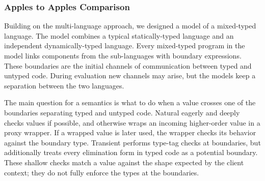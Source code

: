 

\subsubsection{Apples to Apples Comparison}


Building on the  multi-language approach, we designed
 a model of a mixed-typed language.
The model combines a typical statically-typed language and an independent
 dynamically-typed language.
Every mixed-typed program in the model links components from the sub-languages
 with boundary expressions.
These boundaries are the initial channels of communication between typed and
 untyped code.
During evaluation new channels may arise, but the models keep a separation
 between the two languages.

The main question for a semantics is what to do when a value crosses one
 of the boundaries separating typed and untyped code.
Natural eagerly and deeply checks values if possible, and otherwise wraps
 an incoming higher-order value in a proxy wrapper.
If a wrapped value is later used, the wrapper checks its behavior against
 the boundary type.
Transient performs type-tag checks at boundaries, but additionally
 treats every elimination form in typed code as a potential boundary.
These shallow checks match a value against the shape expected by the
 client context; they do not fully enforce the types at the boundaries.


